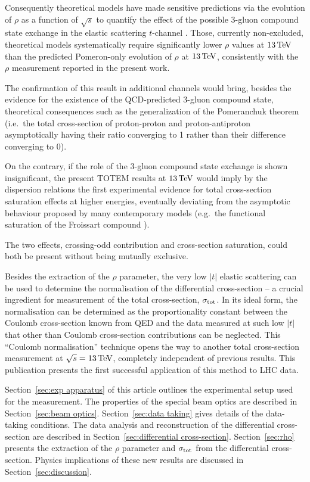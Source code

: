 Consequently theoretical models have made sensitive predictions via the evolution of $\rho$ as a function of $\sqrt s$ to quantify the effect of the possible 3-gluon compound state exchange in the elastic scattering $t$-channel \cite{nicolescu-2007,durham-2018}. Those, currently non-excluded, theoretical models systematically require significantly lower $\rho$ values at $13\,{\rm TeV}$ than the predicted Pomeron-only evolution of $\rho$ at $13\,{\rm TeV}$, consistently with the $\rho$ measurement reported in the present work.

The confirmation of this result in additional channels would bring, besides the evidence for the existence of the QCD-predicted 3-gluon compound state, theoretical consequences such as the generalization of the Pomeranchuk theorem (i.e.~the total cross-section of proton-proton and proton-antiproton asymptotically having their ratio converging to 1 rather than their difference converging to 0).

On the contrary, if the role of the 3-gluon compound state exchange is shown insignificant, the present TOTEM results at $13\,{\rm TeV}$ would imply by the dispersion relations the first experimental evidence for total cross-section saturation effects at higher energies, eventually deviating from the asymptotic behaviour proposed by many contemporary models (e.g.~the functional saturation of the Froissart compound \cite{froissart-1961}).

The two effects, crossing-odd contribution and cross-section saturation, could both be present without being mutually exclusive.

Besides the extraction of the $\rho$ parameter, the very low $|t|$ elastic scattering can be used to determine the normalisation of the differential cross-section -- a crucial ingredient for measurement of the total cross-section, $\sigma_{\rm tot}$. In its ideal form, the normalisation can be determined as the proportionality constant between the Coulomb cross-section known from QED and the data measured at such low $|t|$ that other than Coulomb cross-section contributions can be neglected. This ``Coulomb normalisation'' technique opens the way to another total cross-section measurement at $\sqrt s = 13\,{\rm TeV}$, completely independent of previous results. This publication presents the first successful application of this method to LHC data.

Section~\ref{sec:exp apparatus} of this article outlines the experimental setup used for the measurement. The properties of the special beam optics are described in Section~\ref{sec:beam optics}. Section~\ref{sec:data taking} gives details of the data-taking conditions. The data analysis and reconstruction of the differential cross-section are described in Section~\ref{sec:differential cross-section}. Section~\ref{sec:rho} presents the extraction of the $\rho$ parameter and $\sigma_{\rm tot}$ from the differential cross-section. Physics implications of these new results are discussed in Section~\ref{sec:discussion}.
